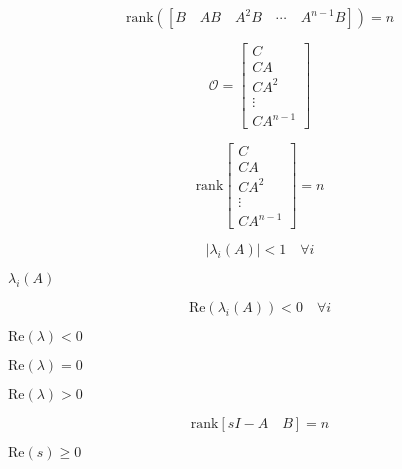 \documentclass{article}
\begin{document}
\[
\text{rank}([B \quad AB \quad A^2B \quad \cdots \quad A^{n-1}B]) = n
\]
\pagebreak

\[
\mathcal{O} = \begin{bmatrix} 
C \\
CA \\
CA^2 \\
\vdots \\
CA^{n-1}
\end{bmatrix}
\]
\pagebreak

\[
\text{rank}\begin{bmatrix} 
C \\
CA \\
CA^2 \\
\vdots \\
CA^{n-1}
\end{bmatrix} = n
\]
\pagebreak

\[
|\lambda_i(A)| < 1 \quad \forall i
\]
\pagebreak

$\lambda_i(A)$
\pagebreak

\[
\text{Re}(\lambda_i(A)) < 0 \quad \forall i
\]
\pagebreak

$\text{Re}(\lambda) < 0$
\pagebreak

$\text{Re}(\lambda) = 0$
\pagebreak

$\text{Re}(\lambda) > 0$
\pagebreak

\[
\text{rank}[sI - A \quad B] = n
\]
\pagebreak

$\text{Re}(s) \geq 0$
\pagebreak
\end{document}
